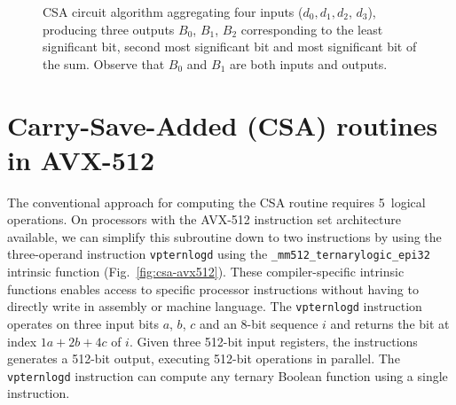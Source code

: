 \documentclass[AMA,STIX1COL]{WileyNJD-v2}
\begin{document}
\begin{figure}
\caption{\label{fig:hsillustration}CSA circuit algorithm aggregating four inputs ($d_0, d_{1}, d_{2}$, $d_{3}$), producing three outputs $B_0$, $B_1$, $B_2$ corresponding to the least significant bit, second most significant bit and most significant bit of the sum. Observe that $B_0$ and $B_1$ are both inputs and outputs.}
\end{figure}


\section{Carry-Save-Added (CSA) routines in AVX-512}

The conventional approach for computing the CSA routine requires 5~logical operations.
On processors with the AVX-512 instruction set architecture available, we can simplify this subroutine down to two instructions by using the three-operand instruction \texttt{vpternlogd} using the \texttt{\_mm512\_ternarylogic\_epi32} intrinsic function (Fig.~\ref{fig:csa-avx512}). These compiler-specific intrinsic functions enables access to specific processor instructions without having to directly write in assembly or machine language. The \texttt{vpternlogd} instruction operates on three input bits $a$, $b$, $c$ and an 8-bit sequence $i$ and returns the bit at index $1a + 2b + 4c$ of $i$. 
Given three 512-bit input registers, the instructions generates a 512-bit output, executing 512-bit operations in parallel. The \texttt{vpternlogd} instruction can compute any ternary Boolean function using a single instruction.
\end{document}
